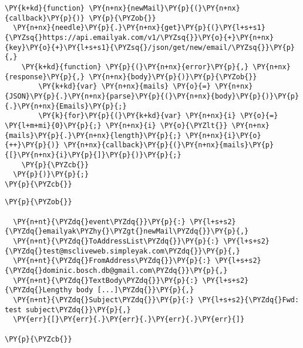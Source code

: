\begin{Verbatim}[commandchars=\\\{\}]
\PY{k+kd}{function} \PY{n+nx}{newMail}\PY{p}{(}\PY{n+nx}{callback}\PY{p}{)} \PY{p}{\PYZob{}}
  \PY{n+nx}{needle}\PY{p}{.}\PY{n+nx}{get}\PY{p}{(}\PY{l+s+s1}{\PYZsq{}https://api.emailyak.com/v1/\PYZsq{}}\PY{o}{+}\PY{n+nx}{key}\PY{o}{+}\PY{l+s+s1}{\PYZsq{}/json/get/new/email/\PYZsq{}}\PY{p}{,}
    \PY{k+kd}{function} \PY{p}{(}\PY{n+nx}{error}\PY{p}{,} \PY{n+nx}{response}\PY{p}{,} \PY{n+nx}{body}\PY{p}{)}\PY{p}{\PYZob{}}
        \PY{k+kd}{var} \PY{n+nx}{mails} \PY{o}{=} \PY{n+nx}{JSON}\PY{p}{.}\PY{n+nx}{parse}\PY{p}{(}\PY{n+nx}{body}\PY{p}{)}\PY{p}{.}\PY{n+nx}{Emails}\PY{p}{;}
        \PY{k}{for}\PY{p}{(}\PY{k+kd}{var} \PY{n+nx}{i} \PY{o}{=} \PY{l+m+mi}{0}\PY{p}{;} \PY{n+nx}{i} \PY{o}{\PYZlt{}} \PY{n+nx}{mails}\PY{p}{.}\PY{n+nx}{length}\PY{p}{;} \PY{n+nx}{i}\PY{o}{++}\PY{p}{)} \PY{n+nx}{callback}\PY{p}{(}\PY{n+nx}{mails}\PY{p}{[}\PY{n+nx}{i}\PY{p}{]}\PY{p}{)}\PY{p}{;}
    \PY{p}{\PYZcb{}}
  \PY{p}{)}\PY{p}{;}
\PY{p}{\PYZcb{}}
\end{Verbatim}

\begin{Verbatim}[commandchars=\\\{\}]
\PY{p}{\PYZob{}}
  
  \PY{n+nt}{\PYZdq{}event\PYZdq{}}\PY{p}{:} \PY{l+s+s2}{\PYZdq{}emailyak\PYZhy{}\PYZgt{}newMail\PYZdq{}}\PY{p}{,}
  \PY{n+nt}{\PYZdq{}ToAddressList\PYZdq{}}\PY{p}{:} \PY{l+s+s2}{\PYZdq{}test@mscliveweb.simpleyak.com\PYZdq{}}\PY{p}{,}
  \PY{n+nt}{\PYZdq{}FromAddress\PYZdq{}}\PY{p}{:} \PY{l+s+s2}{\PYZdq{}dominic.bosch.db@gmail.com\PYZdq{}}\PY{p}{,}
  \PY{n+nt}{\PYZdq{}TextBody\PYZdq{}}\PY{p}{:} \PY{l+s+s2}{\PYZdq{}Lengthy body [...]\PYZdq{}}\PY{p}{,}
  \PY{n+nt}{\PYZdq{}Subject\PYZdq{}}\PY{p}{:} \PY{l+s+s2}{\PYZdq{}Fwd: test subject\PYZdq{}}\PY{p}{,}
  \PY{err}{[}\PY{err}{.}\PY{err}{.}\PY{err}{.}\PY{err}{]}

\PY{p}{\PYZcb{}}
\end{Verbatim}
